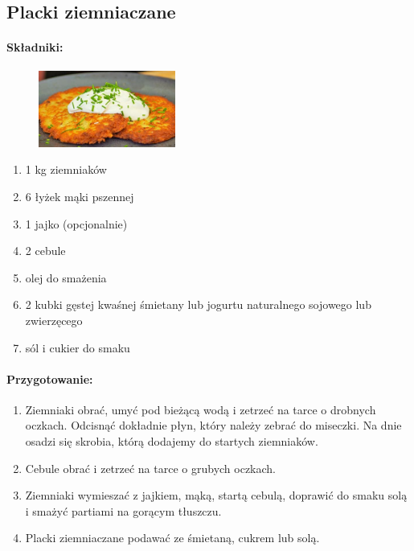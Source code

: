 \documentclass{article}
\begin{document}
    \subsection{Placki ziemniaczane}
    \bigskip
    \paragraph{Składniki:}
    \begin{figure}
        \includegraphics[width=0.4\textwidth]{placki_ziemniaczane.jpg}
    \end{figure}
    \begin{enumerate}
        \item 1 kg ziemniaków
        \item 6 łyżek mąki pszennej
        \item 1 jajko (opcjonalnie)
        \item 2 cebule
        \item olej do smażenia
        \item 2 kubki gęstej kwaśnej śmietany lub jogurtu naturalnego sojowego lub zwierzęcego
        \item sól i cukier do smaku
    \end{enumerate}

    \paragraph{Przygotowanie:}
    \begin{enumerate}
        \item Ziemniaki obrać, umyć pod bieżącą wodą i zetrzeć na tarce o
            drobnych oczkach. Odcisnąć dokładnie płyn, który należy zebrać do
            miseczki. Na dnie osadzi się skrobia, którą dodajemy do startych
            ziemniaków.
        \item Cebule obrać i zetrzeć na tarce o grubych oczkach.
        \item Ziemniaki wymieszać z jajkiem, mąką, startą cebulą, doprawić do
            smaku solą i smażyć partiami na gorącym tłuszczu.
        \item Placki ziemniaczane podawać ze śmietaną, cukrem lub solą.
    \end{enumerate}
    \newpage
\end{document}
